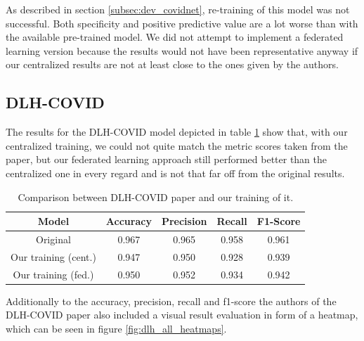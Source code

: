 As described in section \ref{subsec:dev_covidnet}, re-training of this model was not successful. Both specificity and positive predictive value are a lot worse than with the available pre-trained model. We did not attempt to implement a federated learning version because the results would not have been representative anyway if our centralized results are not at least close to the ones given by the authors.

\subsection{DLH-COVID}
The results for the DLH-COVID model depicted in table \ref{tab:results_dlh_covid} show that, with our centralized training, we could not quite match the metric scores taken from the paper, but our federated learning approach still performed better than the centralized one in every regard and is not that far off from the original results.

\begin{table}[htbp]
    \small
    \centering
    \caption{Comparison between DLH-COVID paper\cite{dlh_net} and our training of it.}
    \begin{tabular}{c|c|c|c|c}
        Model & Accuracy & Precision & Recall & F1-Score \\
        \hline
        Original & 0.967 & 0.965 & 0.958 & 0.961 \\
        Our training (cent.) & 0.947 & 0.950 & 0.928 & 0.939\\
        Our training (fed.) & 0.950 & 0.952 & 0.934 & 0.942\\
    \end{tabular}
    \label{tab:results_dlh_covid}
\end{table}

Additionally to the accuracy, precision, recall and f1-score the authors of the DLH-COVID paper also included a visual result evaluation in form of a heatmap, which can be seen in figure \ref{fig:dlh_all_heatmaps}.

